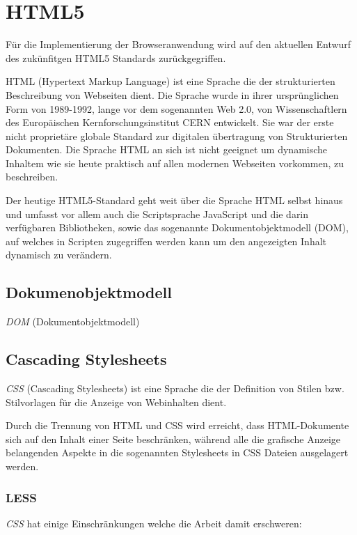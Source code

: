 \section{HTML5}

Für die Implementierung der Browseranwendung wird auf den aktuellen Entwurf des 
zukünfitgen HTML5 Standards zurückgegriffen.

HTML (Hypertext Markup Language) ist eine Sprache die der strukturierten 
Beschreibung von Webseiten dient. Die Sprache wurde in ihrer ursprünglichen Form 
von 1989-1992, lange vor dem sogenannten Web 2.0, von Wissenschaftlern des 
Europäischen Kernforschungsinstitut CERN entwickelt. Sie war der erste nicht 
proprietäre globale Standard zur digitalen übertragung von Strukturierten 
Dokumenten. Die Sprache HTML an sich ist nicht geeignet um dynamische Inhaltem 
wie sie heute praktisch auf allen modernen Webseiten vorkommen, zu beschreiben.

Der heutige HTML5-Standard geht weit über die Sprache HTML selbst hinaus und 
umfasst vor allem auch die Scriptsprache JavaScript und die darin verfügbaren 
Bibliotheken, sowie das sogenannte Dokumentobjektmodell (DOM), auf welches in 
Scripten zugegriffen werden kann um den angezeigten Inhalt dynamisch zu 
verändern.

\subsection{Dokumenobjektmodell}

\textit{DOM} (Dokumentobjektmodell)

\subsection{Cascading Stylesheets}

\textit{CSS} (Cascading Stylesheets) ist eine Sprache die der Definition von 
Stilen bzw. Stilvorlagen für die Anzeige von Webinhalten dient.

Durch die Trennung von HTML und CSS wird erreicht, dass HTML-Dokumente sich auf 
den Inhalt einer Seite beschränken, während alle die grafische Anzeige 
belangenden Aspekte in die sogenannten Stylesheets in CSS Dateien ausgelagert 
werden.

\subsubsection{LESS}

\textit{CSS} hat einige Einschränkungen welche die Arbeit damit erschweren:

